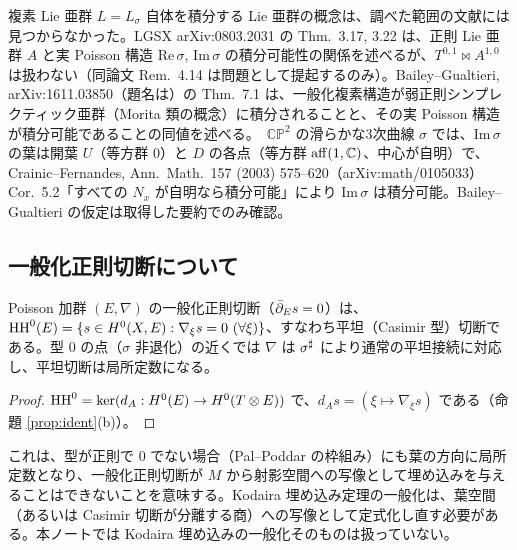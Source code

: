\begin{rem}[\tC\ 積分可能性に関する注意]
複素 Lie 亜群 $L=L_\sigma$ 自体を積分する Lie 亜群の概念は、調べた範囲の文献には見つからなかった。LGSX arXiv:0803.2031 の Thm.\ 3.17, 3.22 は、正則 Lie 亜群 $A$ と実 Poisson 構造 $\mathrm{Re}\,\sigma$, $\mathrm{Im}\,\sigma$ の積分可能性の関係を述べるが、$T^{0,1}\bowtie A^{1,0}$ は扱わない（同論文 Rem.\ 4.14 は問題として提起するのみ）。Bailey--Gualtieri, arXiv:1611.03850（題名は\tQ）の Thm.\ 7.1 は、一般化複素構造が弱正則シンプレクティック亜群（Morita 類の概念）に積分されることと、その実 Poisson 構造が積分可能であることの同値を述べる。\tP\ $\mathbb{CP}^2$ の滑らかな3次曲線 $\sigma$ では、$\mathrm{Im}\,\sigma$ の葉は開葉 $U$（等方群 0）と $D$ の各点（等方群 $\mathrm{aff}(1,\mathbb C)$、中心が自明）で、Crainic--Fernandes, Ann.\ Math.\ 157 (2003) 575--620（arXiv:math/0105033）Cor.\ 5.2「すべての $N_x$ が自明なら積分可能」により $\mathrm{Im}\,\sigma$ は積分可能。Bailey--Gualtieri の仮定は取得した要約でのみ確認\tQ。
\end{rem}

\subsection{一般化正則切断について}\label{sec:ghfun}
\begin{obs}\tP\label{obs:casimir}
Poisson 加群 $(E,\nabla)$ の一般化正則切断（$\bar\partial_E s=0$）は、$\mathrm{HH}^0(E)=\{s\in H^0(X,E):\nabla_\xi s=0\ (\forall\xi)\}$、すなわち平坦（Casimir 型）切断である。型 0 の点（$\sigma$ 非退化）の近くでは $\nabla$ は $\sigma^\sharp$ により通常の平坦接続に対応し、平坦切断は局所定数になる。
\end{obs}
\begin{proof}
$\mathrm{HH}^0=\ker(d_A:H^0(E)\to H^0(T\otimes E))$ で、$d_A s=(\xi\mapsto\nabla_\xi s)$ である（命題 \ref{prop:ident}(b)）。
\end{proof}
\begin{rem}\tK
これは、型が正則で 0 でない場合（Pal--Poddar の枠組み）にも葉の方向に局所定数となり、一般化正則切断が $M$ から射影空間への写像として埋め込みを与えることはできないことを意味する。Kodaira 埋め込み定理の一般化は、葉空間（あるいは Casimir 切断が分離する商）への写像として定式化し直す必要がある。本ノートでは Kodaira 埋め込みの一般化そのものは扱っていない。
\end{rem}
